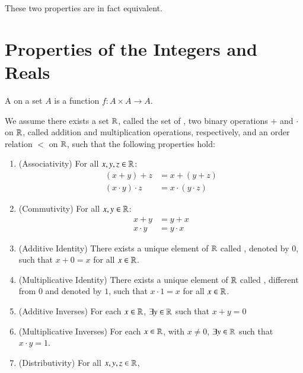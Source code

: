 \documentclass[12pt, a4paper, oneside, openright, titlepage]{book}
\begin{document}
\begin{appendices}
\begin{defn}
        These two properties are in fact equivalent.
    \end{defn}


    \section{Properties of the Integers and Reals}


    \begin{defn}
        A  on a set $A$ is a function $f:A\times A\rightarrow A$.
    \end{defn}


    \begin{cons}
        We assume there exists a set $\mathbb R$, called the set of , two binary operations $+$ and $\cdot$ on $\mathbb R$, called addition and multiplication operations, respectively, and an order relation $<$ on $\mathbb R$, such that the following properties hold: \begin{enumerate}
            \item (Associativity) For all $x,y,z \in \mathbb R$:\begin{align}
                    (x+y)+z &= x+(y+z) \\
                    (x\cdot y)\cdot z &= x\cdot (y\cdot z) 
                \end{align}
            \item (Commutivity) For all $x,y \in \mathbb R$:\begin{align}
                x+y &= y+x \\
                x\cdot y &= y \cdot x
                \end{align}
            \item (Additive Identity) There exists a unique element of $\mathbb R$ called , denoted by $0$, such that $x+0 = x$ for all $x \in \mathbb R$.
            \item (Multiplicative Identity) There exists a unique element of $\mathbb R$ called , different from $0$ and denoted by $1$, such that $x\cdot 1 = x$ for all $x \in \mathbb R$.
            \item (Additive Inverses) For each $x \in\mathbb R$, $\exists y \in \mathbb R$ such that $x+y = 0$
            \item (Multiplicative Inverses) For each $x \in \mathbb R$, with $x \neq 0$, $\exists y \in \mathbb R$ such that $x\cdot y = 1$.
            \item (Distributivity) For all $x,y,z \in \mathbb R$, \begin{equation}

\end{equation}
\end{enumerate}
\end{cons}
\end{appendices}
\end{document}

